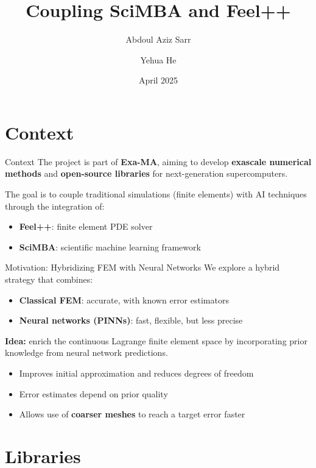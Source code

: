\documentclass{beamer}
\title{Coupling SciMBA and Feel++}
\author{Abdoul Aziz Sarr \and Yehua He}
\date{April 2025}
\begin{document}
\maketitle

\section{Context}
\begin{frame}{Context}
  The project is part of \textbf{Exa-MA}, aiming to develop \textbf{exascale numerical methods} and \textbf{open-source libraries} for next-generation supercomputers.

  The goal is to couple traditional simulations (finite elements) with AI techniques through the integration of:
  \begin{itemize}
    \item \textbf{Feel++}: finite element PDE solver
    \item \textbf{SciMBA}: scientific machine learning framework
  \end{itemize}
\end{frame}

\begin{frame}{Motivation: Hybridizing FEM with Neural Networks}
We explore a hybrid strategy that combines:
\begin{itemize}
  \item \textbf{Classical FEM}: accurate, with known error estimators
  \item \textbf{Neural networks (PINNs)}: fast, flexible, but less precise
\end{itemize}

\vspace{1em}
\textbf{Idea:} enrich the continuous Lagrange finite element space by incorporating prior knowledge from neural network predictions.

\begin{itemize}
  \item Improves initial approximation and reduces degrees of freedom
  \item Error estimates depend on prior quality
  \item Allows use of \textbf{coarser meshes} to reach a target error faster
\end{itemize}
\end{frame}

\section{Libraries}
\end{document}
